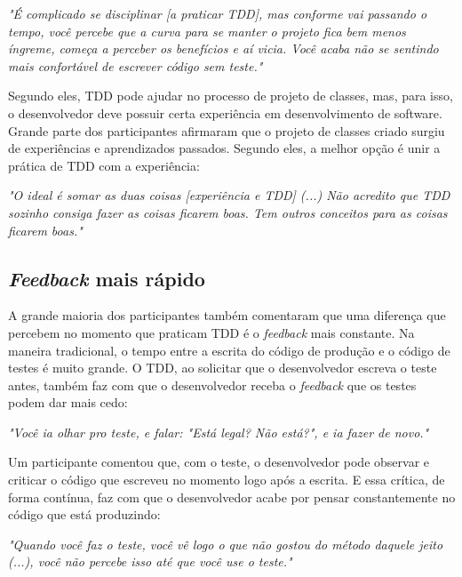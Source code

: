 \documentclass[conference]{IEEEtran}
\begin{document}
\begin{framed}
\textit{"É complicado se disciplinar [a praticar TDD], mas conforme vai passando o tempo, 
você percebe que a curva para se manter o projeto fica bem menos íngreme, 
começa a perceber os benefícios e aí vicia. Você acaba não se sentindo
mais confortável de escrever código sem teste."}
\end{framed}

Segundo eles, TDD pode ajudar no processo de projeto de classes, mas, para isso,
o desenvolvedor deve possuir certa experiência em desenvolvimento de software. 
Grande parte dos participantes afirmaram que o 
projeto de classes criado surgiu de experiências e aprendizados passados.
Segundo eles, a melhor opção é unir a prática de TDD com a experiência:

\begin{framed}
\textit{"O ideal é somar as duas coisas [experiência e TDD] (...) 
Não acredito que TDD sozinho consiga fazer as coisas ficarem boas. Tem outros conceitos
para as coisas ficarem boas."}
\end{framed}


\subsection{\textit{Feedback} mais rápido}

A grande maioria dos participantes também comentaram que uma diferença que percebem
no momento que praticam TDD é o \textit{feedback} mais constante. Na maneira
tradicional, o tempo entre a escrita do código de produção e o código
de testes é muito grande. O TDD, ao solicitar que o desenvolvedor
escreva o teste antes, também faz com que o desenvolvedor receba o \textit{feedback} que
os testes podem dar mais cedo:

\begin{framed}
\textit{"Você ia olhar pro teste, e falar: "Está legal? Não está?", e ia fazer de novo."}
\end{framed}

Um participante comentou que, com o teste, o desenvolvedor pode observar
e criticar o código que escreveu no momento logo após a escrita.
E essa crítica, de forma contínua, faz com que o desenvolvedor acabe
por pensar constantemente no código que está produzindo:

\begin{framed}
\textit{"Quando você faz o teste, você vê logo o que não gostou do método daquele jeito (...), você
não percebe isso até que você use o teste."}
\end{framed}
\end{document}
